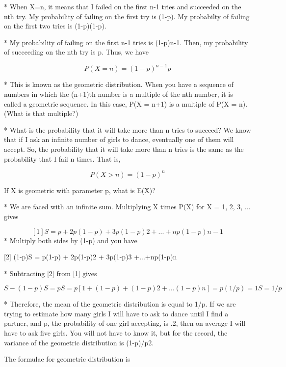 * When X=n, it means that I failed on the first n-1 tries and succeeded on the nth try. My probability of failing on the first try is (1-p). My probabilty of failing on the first two tries is (1-p)(1-p). 


* My probability of failing on the first n-1 tries is (1-p)n-1. Then, my probability of succeeding on the nth try is p. Thus, we have 

\[ P(X = n) = (1-p)^{n-1}p \]

* This is known as the geometric distribution. When you have a sequence of numbers in which the (n+1)th number is a multiple of the nth number, it is called a geometric sequence. In this case, P(X = n+1) is a multiple of P(X = n). (What is that multiple?) 

* What is the probability that it will take more than n tries to succeed? We know that if I ask an infinite number of girls to dance, eventually one of them will accept. So, the probability that it will take more than n tries is the same as the probability that I fail n times. That is, 

\[ P(X > n) = (1-p)^n \]

If X is geometric with parameter p, what is E(X)? 

* We are faced with an infinite sum. Multiplying X times P(X) for X = 1, 2, 3, ... gives 

\[
[1] S = p + 2p(1-p) + 3p(1-p)2 +...+np(1-p)n-1 
\]
* Multiply both sides by (1-p) and you have

[2] (1-p)S = p(1-p) + 2p(1-p)2 + 3p(1-p)3 +...+np(1-p)n 


* Subtracting [2] from [1] gives 

\[S - (1-p)S = pS = p[1 + (1-p) + (1-p)2 + ...(1-p)n] = p(1/p) = 1
S = 1/p \]

* Therefore, the mean of the geometric distribution is equal to 1/p. If we are trying to estimate how many girls I will have to ask to dance until I find a partner, and p, the probability of one girl accepting, is .2, then on average I will have to ask five girls. 
You will not have to know it, but for the record, the variance of the geometric distribution is (1-p)/p2. 


The formulae for geometric distribution is


